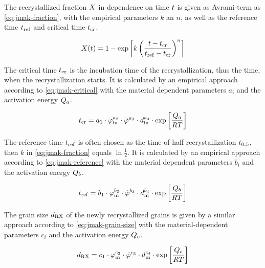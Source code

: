The recrystallized fraction ${X}$ in dependence on time ${t}$ is given as Avrami-term as \autoref{eq:jmak-fraction}, with the empirical parameters $k$ an $n$, as well as the reference time ${t}_{\mathrm{ref}}$ and critical time ${t}_{{\mathrm{cr}}}$.

\begin{equation}
    {X}({t}) = 1 - \exp \left[ k \left( \frac{{t} - {t}_{\mathrm{cr}}}{{t}_{\mathrm{ref}} - {t}_{\mathrm{cr}}} \right)^n \right]
    \label{eq:jmak-fraction}
\end{equation}

The critical time ${t}_{\mathrm{cr}}$ is the incubation time of the recrystallization, thus the time, when the recrystallization starts.
It is calculated by an empirical approach according to \autoref{eq:jmak-critical} with the material dependent parameters $a_i$ and the activation energy ${Q}_a$.

\begin{equation}
    {t}_{{\mathrm{cr}}} = a_1 \cdot {\varphi}_{{\mathrm{in}}}^{a_2} \cdot {\dot{\varphi}}^{a_3} \cdot {d}_{{\mathrm{in}}}^{a_4} \cdot \exp \left[ \frac{{Q}_a}{{R} {T}} \right]
    \label{eq:jmak-critical}
\end{equation}

The reference time ${t}_{\mathrm{ref}}$ is often chosen as the time of half recrystallization ${t}_{0.5}$, then $k$ in \autoref{eq:jmak-fraction} equals $\ln \frac12$.
It is calculated by an empirical approach according to \autoref{eq:jmak-reference} with the material dependent parameters $b_i$ and the activation energy ${Q}_b$.

\begin{equation}
    {t}_{{\mathrm{ref}}} = b_1 \cdot {\varphi}_{{\mathrm{in}}}^{b_2} \cdot {\dot{\varphi}}^{b_3} \cdot {d}_{{\mathrm{in}}}^{b_4} \cdot \exp \left[ \frac{{Q}_b}{{R} {T}} \right]
    \label{eq:jmak-reference}
\end{equation}

The grain size ${d}_{\mathrm{RX}}$ of the newly recrystallized grains is given by a similar approach according to \autoref{eq:jmak-grain-size} with the material-dependent parameters $c_i$ and the activation energy ${Q}_c$.

\begin{equation}
    {d}_{\mathrm{RX}} = c_1 \cdot {\varphi}_{{\mathrm{in}}}^{c_2} \cdot {\dot{\varphi}}^{c_3} \cdot {d}_{{\mathrm{in}}}^{c_4} \cdot \exp \left[ \frac{{Q}_c}{{R} {T}} \right]
    \label{eq:jmak-grain-size}
\end{equation}

